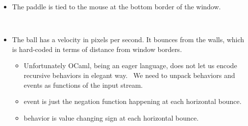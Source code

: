\documentclass{beamer}
\newcommand{\tmverbatim}[1]{\text{{\ttfamily{#1}}}}
\begin{document}
\begin{itemize}
  {}{}{\hlopt{=}}{\hlendline{}}\\
  {}{\hlopt{(}}{}{}{\hlopt{->
  }}{}{\hlopt{(}}{}{}{}{\hlopt{,
  }}{}{\hlendline{}}\\
  {\hlstd{ \ \ \ }}{\hlopt{[}}{}{\hlopt{(}}{}{\hlopt{,
  }}{}{\hlopt{, }}{}{\hlopt{,
  }}{}{\hlopt{-}}{}{\hlopt{); }}{}{\hlopt{(}}{}{\hlopt{,
  }}{}{\hlopt{-}}{}{\hlopt{,
  }}{}{\hlopt{-}}{}{\hlopt{,
  }}{}{\hlopt{);}}{\hlendline{}}\\
  {\hlstd{ \ \ \ \ }}{}{\hlopt{(}}{}{\hlopt{-}}{}{\hlopt{,
  }}{}{\hlopt{, }}{}{\hlopt{,
  }}{}{\hlopt{-}}{}{\hlopt{)]))}}{\hlendline{}}\\
  {}{\hlendline{}}
  
  \item The paddle is tied to the mouse at the bottom border of the window.
  
  {}{}{\hlopt{= }}{}{\hlopt{(}}{}{}{\hlopt{->}}{\hlendline{}}\\
  {\hlstd{ \ }}{}{\hlopt{(}}{}{}{}{\hlopt{,
  }}{}{\hlopt{(}}{}{\hlopt{, }}{}{\hlopt{,
  }}{}{\hlopt{, }}{}{\hlopt{)))
  }}{}{\hlendline{}}
  
  \item The ball has a velocity in pixels per second. It bounces from the
  walls, which is hard-coded in terms of distance from window borders.
  \begin{itemize}
    \item Unfortunately OCaml, being an eager language, does not let us encode
    recursive behaviors in elegant way. \ We need to unpack behaviors and
    events as functions of the input stream.
    
    \item {}{\hlopt{->> (}}{\hlstd{$\sim$}}{} event
    is just the negation function happening at each horizontal bounce.
    
    \item {}{\hlopt{(}}{}{\hlopt{->> (}}{\hlstd{$\sim$}}{} behavior is
    \tmverbatim{vel} value changing sign at each horizontal bounce.
    

\end{itemize}
\end{itemize}
\end{document}
